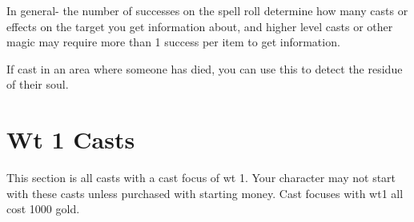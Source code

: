 \begin{GRPtablewide}
{	In general- the number of successes on the spell roll determine how many casts or effects on the target you get information about, and higher level casts or other magic may require more than 1 success per item to get information.

	If cast in an area where someone has died, you can use this to detect the residue of their soul.
	}
\end{GRPtablewide}

\section{Wt 1 Casts}

This section is all casts with a cast focus of wt 1. Your character may not start with these casts unless purchased with starting money. Cast focuses with wt1 all cost 1000 gold.


